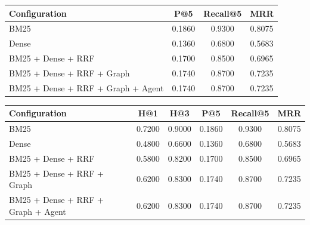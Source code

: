 \begin{tabular}{lccc}
\hline
Configuration & P@5 & Recall@5 & MRR \\
\hline
BM25 & 0.1860 & 0.9300 & 0.8075 \\
Dense & 0.1360 & 0.6800 & 0.5683 \\
BM25 + Dense + RRF & 0.1700 & 0.8500 & 0.6965 \\
BM25 + Dense + RRF + Graph & 0.1740 & 0.8700 & 0.7235 \\
BM25 + Dense + RRF + Graph + Agent & 0.1740 & 0.8700 & 0.7235 \\
\hline
\end{tabular}


\begin{tabular}{lccccc}
\hline
Configuration & H@1 & H@3 & P@5 & Recall@5 & MRR \\
\hline
BM25 & 0.7200 & 0.9000 & 0.1860 & 0.9300 & 0.8075 \\
Dense & 0.4800 & 0.6600 & 0.1360 & 0.6800 & 0.5683 \\
BM25 + Dense + RRF & 0.5800 & 0.8200 & 0.1700 & 0.8500 & 0.6965 \\
BM25 + Dense + RRF + Graph & 0.6200 & 0.8300 & 0.1740 & 0.8700 & 0.7235 \\
BM25 + Dense + RRF + Graph + Agent & 0.6200 & 0.8300 & 0.1740 & 0.8700 & 0.7235 \\
\hline
\end{tabular}
